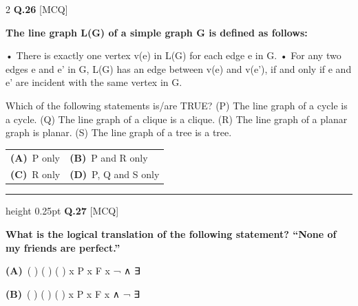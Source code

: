 \documentclass[a4paper,10pt,twoside]{article}
\begin{document}
\begin{multicols}{2}
\noindent\textbf{Q.26} \hfill {\footnotesize\textsf{[MCQ]}}
\par\vspace{2pt}
{\bfseries The line graph L(G) of a simple graph G is defined as follows:
\par\smallskip
•
There is exactly one vertex v(e) in L(G) for each edge e in G.
•
For any two edges e and e' in G, L(G) has an edge between v(e) and v(e'), if and only if e and e'
are incident with the same vertex in G.
\par\smallskip
Which of the following statements is/are TRUE?
(P) The line graph of a cycle is a cycle.
(Q) The line graph of a clique is a clique.
(R) The line graph of a planar graph is planar.
(S) The line graph of a tree is a tree. \par}
\par\vspace{2pt}\noindent
\begin{tabular*}{\columnwidth}{@{\extracolsep{\fill}}p{}p{}@{}}
\textbf{(A)}~P only & \textbf{(B)}~P and R only \\
\addlinespace[2pt]
\textbf{(C)}~R only & \textbf{(D)}~P, Q and S only
\end{tabular*}
\par\vspace{6pt}\hrule height 0.25pt\vspace{6pt}
\noindent\textbf{Q.27} \hfill {\footnotesize\textsf{[MCQ]}}
\par\vspace{2pt}
{\bfseries What is the logical translation of the following statement?
``None of my friends are perfect.'' \par}
\par\vspace{2pt}\noindent
\textbf{(A)}~( ) \newline ( ) \newline ( \newline ) \newline x \newline P \newline x \newline F \newline x \newline ¬ \newline ∧ \newline ∃\par\vspace{2pt}\noindent
\textbf{(B)}~( ) \newline ( ) \newline ( \newline ) \newline x \newline P \newline x \newline F \newline x \newline ∧ \newline ¬ \newline ∃\par\vspace{2pt}\noindent

\end{multicols}
\end{document}
